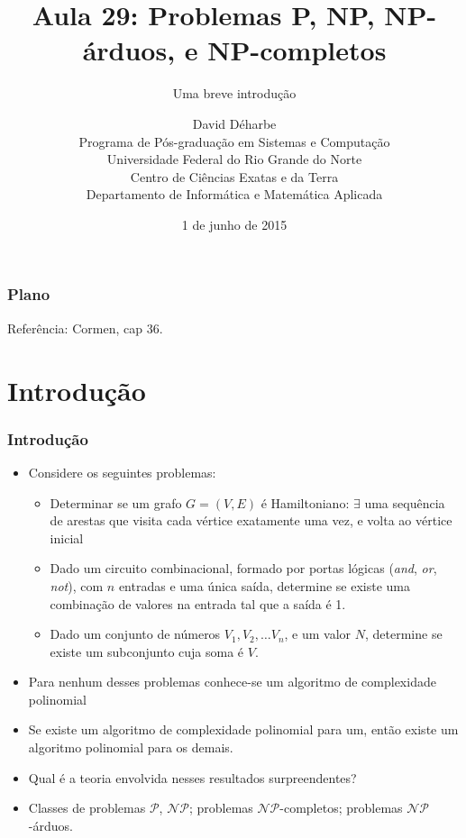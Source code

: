 \documentclass{beamer}
\title{Aula 29: Problemas P, NP, NP-árduos, e NP-completos}
\subtitle{Uma breve introdução}
\author{David Déharbe \\
  Programa de Pós-graduação em Sistemas e Computação \\
  Universidade Federal do Rio Grande do Norte \\
  Centro de Ciências Exatas e da Terra \\
  Departamento de Informática e Matemática Aplicada}
\date{1 de junho de 2015}
\newcommand{\classP}[0]{\ensuremath{\mathcal{P}}\xspace}
\newcommand{\classNP}[0]{\ensuremath{\mathcal{NP}}\xspace}
\begin{document}


\begin{frame}
  \titlepage
\end{frame}

\begin{frame}
  \frametitle{Plano}

  \tableofcontents
Referência: Cormen, cap 36.
\end{frame}

\section{Introdução}


\begin{frame}
\frametitle{Introdução}

\begin{itemize}

\item Considere os seguintes problemas:

\begin{itemize}
\item Determinar se um grafo $G=(V, E)$ é \alert{Hamiltoniano}:
  $\exists$ uma sequência de arestas que visita cada vértice
  exatamente uma vez, e volta ao vértice inicial

\item Dado um circuito combinacional, formado por portas lógicas (\textit{and},
  \textit{or}, \textit{not}), com $n$ entradas e uma única saída, determine se
  existe uma combinação de valores na entrada tal que a saída é 1.

\item Dado um conjunto de números $V_1, V_2, \ldots V_n$, e um valor $N$,
  determine se existe um subconjunto cuja soma é $V$.

\end{itemize}

\item Para nenhum desses problemas conhece-se um algoritmo de complexidade
  polinomial

\item Se existe um algoritmo de complexidade polinomial para um,
  então existe um algoritmo polinomial para os demais.

\item Qual é a teoria envolvida nesses resultados surpreendentes?

\item Classes de problemas \classP, \classNP; problemas
  \classNP-completos; problemas \classNP-árduos.

\end{itemize}

\end{frame}
\end{document}
